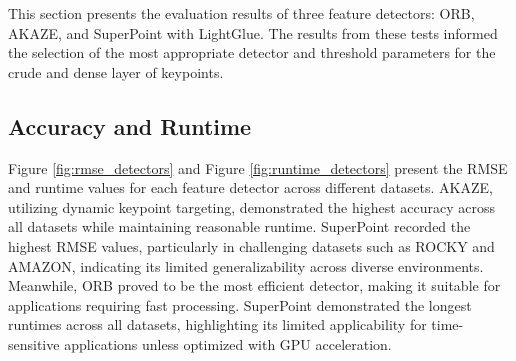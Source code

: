 This section presents the evaluation results of three feature detectors: ORB, AKAZE, and SuperPoint with LightGlue. The results from these tests informed the selection of the most appropriate detector and threshold parameters for the crude and dense layer of keypoints.

\subsection{Accuracy and Runtime}

Figure \ref{fig:rmse_detectors} and Figure \ref{fig:runtime_detectors} present the RMSE and runtime values for each feature detector across different datasets. AKAZE, utilizing dynamic keypoint targeting, demonstrated the highest accuracy across all datasets while maintaining reasonable runtime. SuperPoint recorded the highest RMSE values, particularly in challenging datasets such as ROCKY and AMAZON, indicating its limited generalizability across diverse environments. Meanwhile, ORB proved to be the most efficient detector, making it suitable for applications requiring fast processing. SuperPoint demonstrated the longest runtimes across all datasets, highlighting its limited applicability for time-sensitive applications unless optimized with GPU acceleration.

